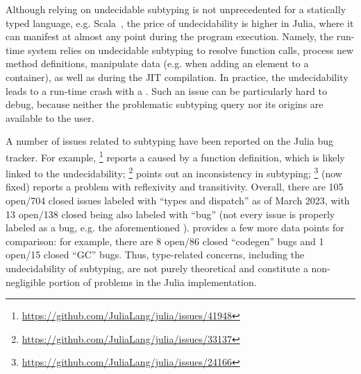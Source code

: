 Although relying on undecidable subtyping is not unprecedented
for a statically typed language, e.g. Scala~\cite{hu:dot-undec:2020},
the price of undecidability
is higher in Julia, where it
can manifest at almost any point during the program execution.
Namely, the run-time system relies on undecidable subtyping
to resolve function calls,
process new method definitions,
manipulate data (e.g. when adding an element to a container),
as well as during the JIT compilation.
In practice, the undecidability
leads to a run-time crash with a .
Such an issue can be particularly hard to debug,
because neither the problematic subtyping query nor its origins are available
to the user.

A number of issues related to subtyping have been reported
on the Julia bug tracker. For example,
\href{https://github.com/JuliaLang/julia/issues/41948}{}\footnote{
    \url{https://github.com/JuliaLang/julia/issues/41948}
} reports a  caused by a function definition,
which is likely linked to the undecidability;
\href{https://github.com/JuliaLang/julia/issues/33137}{}\footnote{
    \url{https://github.com/JuliaLang/julia/issues/33137}
} points out an inconsistency in subtyping; %
\href{https://github.com/JuliaLang/julia/issues/24166}{}\footnote{
    \url{https://github.com/JuliaLang/julia/issues/24166} 
} (now fixed) reports a problem with reflexivity and transitivity.
Overall, there are 105 open/704 closed issues labeled with ``types and
dispatch'' as of March 2023,
with 13 open/138 closed being also labeled with ``bug''
(not every issue is properly labeled as a bug,
e.g. the aforementioned
\href{https://github.com/JuliaLang/julia/issues/24166}{}).
 provides a few more data points for comparison:
for example, there are 8 open/86 closed ``codegen'' bugs
and 1 open/15 closed ``GC'' bugs.
Thus, type-related concerns, including the undecidability of subtyping,
are not purely theoretical and
constitute a non-negligible portion of problems in the Julia implementation.

